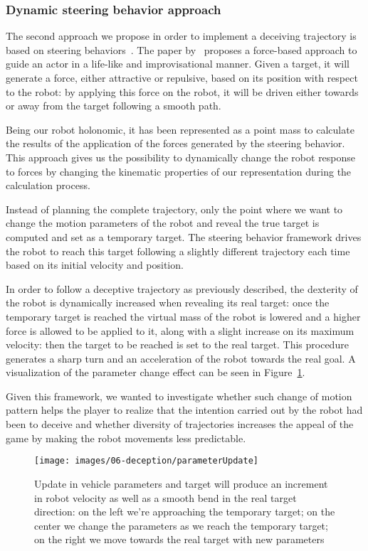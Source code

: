 \subsubsection{Dynamic steering behavior approach}
The second approach we propose in order to implement a deceiving trajectory is based on steering behaviors~\citep{reynolds_steering_1999}. The paper by~\cite{reynolds_steering_1999} proposes a force-based approach to guide an actor in a life-like and improvisational manner. Given a target, it will generate a force, either attractive or repulsive, based on its position with respect to the robot: by applying this force on the robot, it will be driven either towards or away from the target following a smooth path.

Being our robot holonomic, it has been represented as a point mass to calculate the results of the application of the forces generated by the steering behavior. This approach gives us the possibility to dynamically change the robot response to forces by changing the kinematic properties of our representation during the calculation process.

Instead of planning the complete trajectory, only the point where we want to change the motion parameters of the robot and reveal the true target is computed and set as a temporary target. The steering behavior framework drives the robot to reach this target following a slightly different trajectory each time based on its initial velocity and position.

In order to follow a deceptive trajectory as previously described, the dexterity of the robot is dynamically increased when revealing its real target: once the temporary target is reached the virtual mass of the robot is lowered and a higher force is allowed to be applied to it, along with a slight increase on its maximum velocity: then the target to be reached is set to the real target. This procedure generates a sharp turn and an acceleration of the robot towards the real goal. A visualization of the parameter change effect can be seen in Figure~\ref{fig::trajectorySteering}. 

Given this framework, we wanted to investigate whether such change of motion pattern helps the player to realize that the intention carried out by the robot had been to deceive and whether diversity of trajectories increases the appeal of the game by making the robot movements less predictable.

\begin{figure}[htbp]
    \centering
    \texttt{[image: images/06-deception/parameterUpdate]}
    \caption{Update in vehicle parameters and target will produce an increment in robot velocity as well as a smooth bend in the real target direction: on the left we're approaching the temporary target; on the center we change the parameters as we reach the temporary target; on the right we move towards the real target with new parameters}
    \label{fig::trajectorySteering}
\end{figure}

